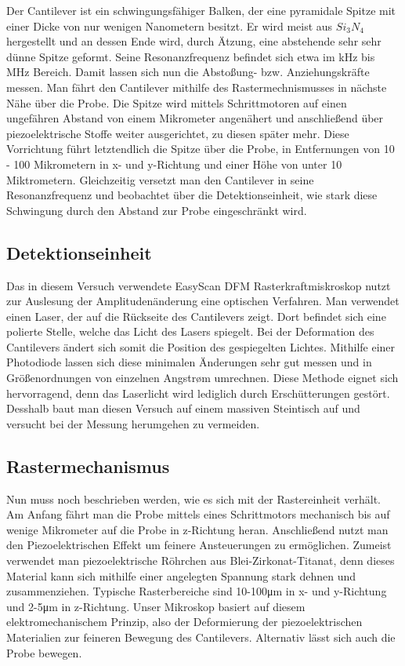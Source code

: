 Der Cantilever ist ein schwingungsfähiger Balken, der eine pyramidale Spitze mit einer Dicke von nur wenigen Nanometern besitzt.
Er wird meist aus $Si_3N_4$ hergestellt und an dessen Ende wird, durch Ätzung, eine abstehende sehr sehr dünne Spitze geformt.
Seine Resonanzfrequenz befindet sich etwa im kHz bis MHz Bereich.
Damit lassen sich nun die Abstoßung- bzw. Anziehungskräfte messen.
Man fährt den Cantilever mithilfe des Rastermechnismusses in nächste Nähe über die Probe.
Die Spitze wird mittels Schrittmotoren auf einen ungefähren Abstand von einem Mikrometer angenähert und anschließend über piezoelektrische Stoffe weiter ausgerichtet, zu diesen später mehr.
Diese Vorrichtung führt letztendlich die Spitze über die Probe, in Entfernungen von 10 - 100 Mikrometern in x- und y-Richtung und einer Höhe von unter 10 Miktrometern.
Gleichzeitig versetzt man den Cantilever in seine Resonanzfrequenz und beobachtet über die Detektionseinheit, wie stark diese Schwingung durch den Abstand zur Probe eingeschränkt wird.

 \subsection{Detektionseinheit}
 
 Das in diesem Versuch verwendete EasyScan DFM Rasterkraftmiskroskop nutzt zur Auslesung der Amplitudenänderung eine optischen Verfahren. 
 Man verwendet einen Laser, der auf die Rückseite des Cantilevers zeigt. 
 Dort befindet sich eine polierte Stelle, welche das Licht des Lasers spiegelt. 
 Bei der Deformation des Cantilevers ändert sich somit die Position des gespiegelten Lichtes.
 Mithilfe einer Photodiode lassen sich diese minimalen Änderungen sehr gut messen und in Größenordnungen von einzelnen Angstrøm umrechnen.
 Diese Methode eignet sich hervorragend, denn das Laserlicht wird lediglich durch Erschütterungen gestört.
 Desshalb baut man diesen Versuch auf einem massiven Steintisch auf und versucht bei der Messung herumgehen zu vermeiden.

\subsection{Rastermechanismus}

Nun muss noch beschrieben werden, wie es sich mit der Rastereinheit verhält.
Am Anfang fährt man die Probe mittels eines Schrittmotors mechanisch bis auf wenige Mikrometer auf die Probe in z-Richtung heran.
Anschließend nutzt man den Piezoelektrischen Effekt um feinere Ansteuerungen zu ermöglichen.
Zumeist verwendet man piezoelektrische Röhrchen aus Blei-Zirkonat-Titanat, denn dieses Material kann sich mithilfe einer angelegten Spannung stark dehnen und zusammenziehen. 
Typische Rasterbereiche sind 10-100μm in x- und y-Richtung und 2-5μm in z-Richtung.
Unser Mikroskop basiert auf diesem elektromechanischem Prinzip, also der Deformierung der piezoelektrischen Materialien zur feineren Bewegung des Cantilevers.
Alternativ lässt sich auch die Probe bewegen.

